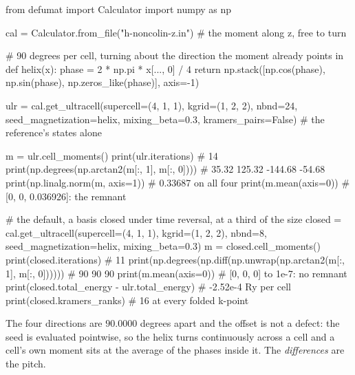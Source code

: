 \documentclass[11pt,a4paper]{article}
\begin{document}
\begin{pycode}
from defumat import Calculator
import numpy as np

cal = Calculator.from_file("h-noncolin-z.in")  # the moment along z, free to turn

# 90 degrees per cell, turning about the direction the moment already points in
def helix(x):
    phase = 2 * np.pi * x[..., 0] / 4
    return np.stack([np.cos(phase), np.sin(phase),
                     np.zeros_like(phase)], axis=-1)

ulr = cal.get_ultracell(supercell=(4, 1, 1), kgrid=(1, 2, 2), nbnd=24,
                        seed_magnetization=helix, mixing_beta=0.3,
                        kramers_pairs=False)   # the reference's states alone

m = ulr.cell_moments()
print(ulr.iterations)                              # 14
print(np.degrees(np.arctan2(m[:, 1], m[:, 0])))    # 35.32 125.32 -144.68 -54.68
print(np.linalg.norm(m, axis=1))                   # 0.33687 on all four
print(m.mean(axis=0))                              # [0, 0, 0.036926]: the remnant

# the default, a basis closed under time reversal, at a third of the size
closed = cal.get_ultracell(supercell=(4, 1, 1), kgrid=(1, 2, 2), nbnd=8,
                           seed_magnetization=helix, mixing_beta=0.3)
m = closed.cell_moments()
print(closed.iterations)                           # 11
print(np.degrees(np.diff(np.unwrap(np.arctan2(m[:, 1], m[:, 0])))))  # 90 90 90
print(m.mean(axis=0))                              # [0, 0, 0] to 1e-7: no remnant
print(closed.total_energy - ulr.total_energy)      # -2.52e-4 Ry per cell
print(closed.kramers_ranks)                        # 16 at every folded k-point
\end{pycode}

The four directions are $90.0000$ degrees apart and the offset is not a defect:
the seed is evaluated pointwise, so the helix turns continuously across a cell
and a cell's own moment sits at the average of the phases inside it. The
\emph{differences} are the pitch.
\end{document}
